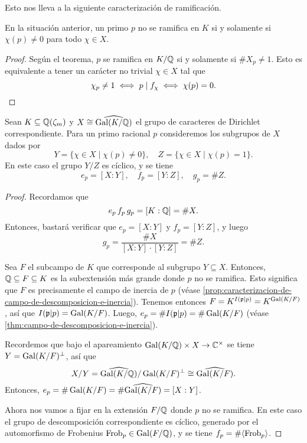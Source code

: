 Esto nos lleva a la siguiente caracterización de ramificación.

\begin{corolario}
  En la situación anterior, un primo $p$ no se ramifica en $K$ si y solamente si
  $\chi (p) \ne 0$ para todo $\chi \in X$.

  \begin{proof}
    Según el teorema, $p$ se ramifica en $K/\mathbb{Q}$ si y solamente si
    $\# X_p \ne 1$. Esto es equivalente a tener un carácter no trivial
    $\chi \in X$ tal que
    \[ \chi_p \ne 1 \iff p \mid f_\chi \iff \chi (p) = 0. \qedhere \]
  \end{proof}
\end{corolario}

\begin{teorema}
  \label{thm:caracteres-de-Dirichlet-descomposicion-e-inercia}
  Sean $K \subseteq \mathbb{Q} (\zeta_m)$ y $X \cong \widehat{\operatorname{Gal} (K/\mathbb{Q})}$ el grupo
  de caracteres de Dirichlet correspondiente. Para un primo racional $p$
  consideremos los subgrupos de $X$ dados por
  \[ Y = \{ \chi\in X \mid \chi (p) \ne 0 \}, \quad
     Z = \{ \chi\in X\mid \chi (p) = 1 \}. \]
  En este caso el grupo $Y/Z$ es cíclico, y se tiene
  \[ e_p = [X:Y], \quad
     f_p = [Y:Z], \quad
     g_p = \# Z. \]
  \begin{proof}
    Recordamos que
    $$e_p\,f_p\,g_p = [K : \mathbb{Q}] = \# X.$$
    Entonces, bastará verificar que $e_p = [X:Y]$ y $f_p = [Y:Z]$, y luego
    $$g_p = \frac{\# X}{[X:Y]\cdot [Y:Z]} = \# Z.$$

    Sea $F$ el subcampo de $K$ que corresponde al subgrupo
    $Y \subseteq X$. Entonces, $\mathbb{Q} \subseteq F \subseteq K$ es la subextensión
    más grande donde $p$ no se ramifica. Esto significa que $F$ es precisamente
    el campo de inercia de $p$ (véase
    \ref{prop:caracterizacion-de-campo-de-descomposicion-e-inercia}). Tenemos
    entonces $F = K^{I (\mathfrak{p}|p)} = K^{\operatorname{Gal} (K/F)}$, así que
    $I (\mathfrak{p}|p) = \operatorname{Gal} (K/F)$. Luego,
    $e_p = \# I (\mathfrak{p}|p) = \# \operatorname{Gal} (K/F)$ (véase
    \ref{thm:campo-de-descomposicion-e-inercia}).

    Recordemos que bajo el apareamiento $\operatorname{Gal} (K/\mathbb{Q}) \times X \to \mathbb{C}^\times$
    se tiene $Y = \operatorname{Gal} (K/F)^\perp$, así que
    \[ X/Y = \widehat{\operatorname{Gal} (K/\mathbb{Q})}/\operatorname{Gal} (K/F)^\perp \cong \widehat{\operatorname{Gal} (K/F)}. \]
    Entonces, $e_p = \# \operatorname{Gal} (K/F) = \# \widehat{\operatorname{Gal} (K/F)} = [X : Y]$.

    Ahora nos vamos a fijar en la extensión $F/\mathbb{Q}$ donde $p$ no se ramifica.
    En este caso el grupo de descomposición correspondiente es cíclico, generado
    por el automorfismo de Frobenius $\operatorname{Frob}_p \in \operatorname{Gal} (F/\mathbb{Q})$, y se tiene
    $f_p = \# \langle \operatorname{Frob}_p\rangle$.


\end{proof}
\end{teorema}
